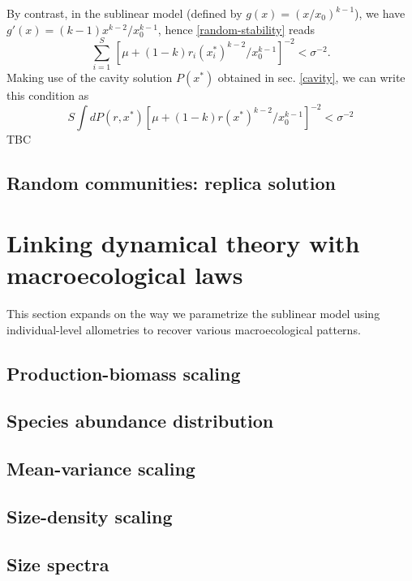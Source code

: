 \documentclass[12pt]{article}
\begin{document}
By contrast, in the sublinear model (defined by $g(x) = (x/x_0)^{k-1}$), we have $g'(x) = (k-1) x^{k-2}/x_0^{k-1}$, hence \eqref{random-stability} reads
\begin{equation}
    \sum_{i=1}^S\, [\mu + (1-k) r_i (x_i^*)^{k-2}/x_0^{k-1}]^{-2}< \sigma^{-2}.
\end{equation} 
Making use of the cavity solution $P(x^*)$ obtained in sec. \ref{cavity}, we can write this condition as 
\begin{equation}
    S \int dP(r, x^*)[\mu + (1-k) r (x^*)^{k-2}/x_0^{k-1}]^{-2}< \sigma^{-2}
\end{equation}
TBC


\subsection{Random communities: replica solution}

\section{Linking dynamical theory with macroecological laws}
This section expands on the way we parametrize the sublinear model using individual-level allometries to recover various macroecological patterns. 

\subsection{Production-biomass scaling}
\subsection{Species abundance distribution}
\subsection{Mean-variance scaling}
\subsection{Size-density scaling}
\subsection{Size spectra}

\printbibliography
\end{document}
